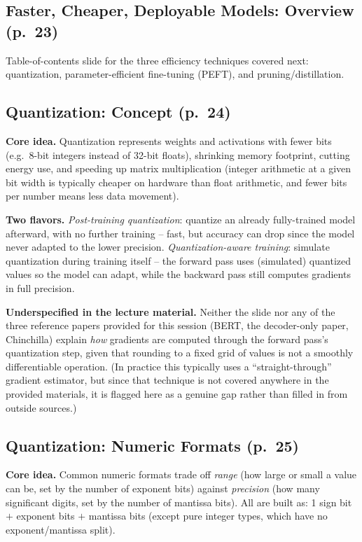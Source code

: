 \documentclass[11pt]{article}
\begin{document}
\subsection{Faster, Cheaper, Deployable Models: Overview (p.\ 23)}

Table-of-contents slide for the three efficiency techniques covered next: quantization, parameter-efficient fine-tuning (PEFT), and pruning/distillation.

\subsection{Quantization: Concept (p.\ 24)}

\textbf{Core idea.} Quantization represents weights and activations with fewer bits (e.g.\ 8-bit integers instead of 32-bit floats), shrinking memory footprint, cutting energy use, and speeding up matrix multiplication (integer arithmetic at a given bit width is typically cheaper on hardware than float arithmetic, and fewer bits per number means less data movement).

\textbf{Two flavors.} \emph{Post-training quantization}: quantize an already fully-trained model afterward, with no further training -- fast, but accuracy can drop since the model never adapted to the lower precision. \emph{Quantization-aware training}: simulate quantization during training itself -- the forward pass uses (simulated) quantized values so the model can adapt, while the backward pass still computes gradients in full precision.

\textbf{Underspecified in the lecture material.} Neither the slide nor any of the three reference papers provided for this session (BERT, the decoder-only paper, Chinchilla) explain \emph{how} gradients are computed through the forward pass's quantization step, given that rounding to a fixed grid of values is not a smoothly differentiable operation. (In practice this typically uses a ``straight-through'' gradient estimator, but since that technique is not covered anywhere in the provided materials, it is flagged here as a genuine gap rather than filled in from outside sources.)

\subsection{Quantization: Numeric Formats (p.\ 25)}

\textbf{Core idea.} Common numeric formats trade off \emph{range} (how large or small a value can be, set by the number of exponent bits) against \emph{precision} (how many significant digits, set by the number of mantissa bits). All are built as: 1 sign bit $+$ exponent bits $+$ mantissa bits (except pure integer types, which have no exponent/mantissa split).
\end{document}
